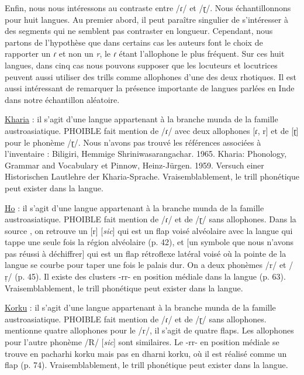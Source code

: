Enfin, nous nous intéressons au contraste entre /ɾ/ et /ɽ/. Nous échantillonnons pour huit langues. Au premier abord, il peut paraître singulier de s'intéresser à des segments qui ne semblent pas contraster en longueur. Cependant, nous partons de l'hypothèse que dans certains cas les auteurs font le choix de rapporter un \textit{ɾ} et non un \textit{r}, le \textit{ɾ} étant l'allophone le plus fréquent.
Sur ces huit langues, dans cinq cas nous pouvons supposer que les locuteurs et locutrices peuvent aussi utiliser des trills comme allophones d'une des deux rhotiques. Il est aussi intéressant de remarquer la présence importante de langues parlées en Inde dans notre échantillon aléatoire.

\begin{exe}
	\ex \begin{xlist}
		
		\ex  \href{https://phoible.org/inventories/view/11}{Kharia}   : il s'agit d'une langue appartenant à la branche munda de la famille austroasiatique. PHOIBLE fait mention de /ɾ/ avec deux allophones [ɾ, r] et de [ɽ] pour le phonème /ɽ/. Nous n'avons pas trouvé les références associées à l'inventaire :  Biligiri, Hemmige Shriniwasarangachar. 1965. Kharia: Phonology, Grammar and Vocabulary et Pinnow, Heinz-Jürgen. 1959. Versuch einer Historischen Lautlehre der Kharia-Sprache. Vraisemblablement, le trill phonétique peut exister dans la langue.
	
	\ex \href{https://phoible.org/inventories/view/1729}{Ho}  : il s'agit d'une langue appartenant à la branche munda de la famille austroasiatique. PHOIBLE fait mention de /ɾ/ et de /ɽ/ sans allophones. Dans la source \textcite{centralinstituteofindianlanguagesHoGrammar2007}, on retrouve un [r] [\textit{sic}] qui est un flap voisé alvéolaire avec la langue qui tappe une seule fois la région alvéolaire (p. 42), et [un symbole que nous n'avons pas réussi à déchiffrer] qui est un flap rétroflexe latéral voisé où la pointe de la langue se courbe pour taper une fois le palais dur. On a deux phonèmes /r/ et /ṛ/ (p. 45). Il existe des clusters -rr- en position médiale dans la langue (p. 63). Vraisemblablement, le trill phonétique peut exister dans la langue.
	
	\ex \href{https://phoible.org/inventories/view/1749}{Korku}  : il s'agit d'une langue appartenant à la branche munda de la famille austroasiatique. PHOIBLE fait mention de /ɾ/ et de /ɽ/ sans allophones. \textcite{zideKorkuPhonologyMorphophonemics1960} mentionne quatre allophones pour le /r/, il s'agit de quatre flaps. Les allophones pour l'autre phonème /R/ [\textit{sic}] sont similaires. Le -rr- en position médiale se trouve en pacharhi korku mais pas en dharni korku, où il est réalisé comme un flap (p. 74). Vraisemblablement, le trill phonétique peut exister dans la langue.
	

\end{xlist}
\end{exe}
